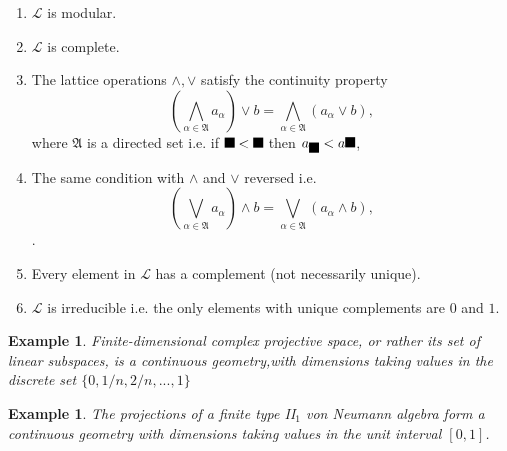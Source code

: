 \documentclass[aps,preprint]{revtex4}%
\providecommand{\U}[1]{\protect\rule{.1in}{.1in}}
\newtheorem{example}[theorem]{Example}
\begin{document}
\begin{enumerate}
\item $\mathcal{L}$ is modular.

\item $\mathcal{L}$ is complete.

\item The lattice operations $\wedge,\vee$ satisfy the continuity property%
\begin{equation}
\left(
{\textstyle\bigwedge\limits_{\alpha\in\mathfrak{A}}}
a_{\alpha}\right)  \vee b=%
{\textstyle\bigwedge\limits_{\alpha\in\mathfrak{A}}}
\left(  a_{\alpha}\vee b\right)  ,
\end{equation}
where $\mathfrak{A}$ is a directed set i.e. if $\U{3b1} <\U{3b2} $ then
$a_{\U{3b1} }<a\U{1d66} $,

\item The same condition with $\wedge$ and $\vee$ reversed i.e.
\begin{equation}
\left(
{\textstyle\bigvee\limits_{\alpha\in\mathfrak{A}}}
a_{\alpha}\right)  \wedge b=%
{\textstyle\bigvee\limits_{\alpha\in\mathfrak{A}}}
\left(  a_{\alpha}\wedge b\right)  ,
\end{equation}
.

\item Every element in $\mathcal{L}$ has a complement (not necessarily unique).

\item $\mathcal{L}$ is irreducible i.e. the only elements with unique
complements are $0$ and $1$.
\end{enumerate}

\begin{example}
Finite-dimensional complex projective space, or rather its set of linear
subspaces, is a continuous geometry,with dimensions taking values in the
discrete set $\{0,1/n,2/n,...,1\}$
\end{example}

\begin{example}
The projections of a finite type II$_{1}$ von Neumann algebra form a
continuous geometry with dimensions taking values in the unit interval $[0,1]$.
\end{example}
\end{document}
